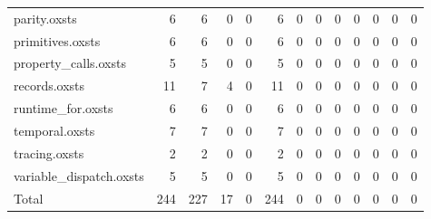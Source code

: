 \begin{tabular}{lrrrrrrrrrrrr}
parity.oxsts & 6 & 6 & 0 & 0 & 6 & 0 & 0 & 0 & 0 & 0 & 0 & 0 \\
primitives.oxsts & 6 & 6 & 0 & 0 & 6 & 0 & 0 & 0 & 0 & 0 & 0 & 0 \\
property\_calls.oxsts & 5 & 5 & 0 & 0 & 5 & 0 & 0 & 0 & 0 & 0 & 0 & 0 \\
records.oxsts & 11 & 7 & 4 & 0 & 11 & 0 & 0 & 0 & 0 & 0 & 0 & 0 \\
runtime\_for.oxsts & 6 & 6 & 0 & 0 & 6 & 0 & 0 & 0 & 0 & 0 & 0 & 0 \\
temporal.oxsts & 7 & 7 & 0 & 0 & 7 & 0 & 0 & 0 & 0 & 0 & 0 & 0 \\
tracing.oxsts & 2 & 2 & 0 & 0 & 2 & 0 & 0 & 0 & 0 & 0 & 0 & 0 \\
variable\_dispatch.oxsts & 5 & 5 & 0 & 0 & 5 & 0 & 0 & 0 & 0 & 0 & 0 & 0 \\
\midrule
Total & 244 & 227 & 17 & 0 & 244 & 0 & 0 & 0 & 0 & 0 & 0 & 0 \\
\bottomrule
\end{tabular}
